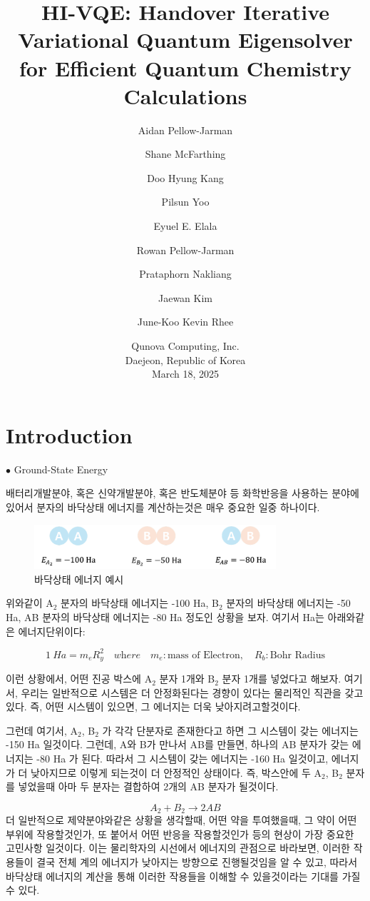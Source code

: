 \documentclass[10pt]{article}
\title{
  HI-VQE: Handover Iterative Variational Quantum Eigensolver\\
  for Efficient Quantum Chemistry Calculations
}
\author{
  Aidan Pellow-Jarman \and
  Shane McFarthing \and
  Doo Hyung Kang \and
  Pilsun Yoo \and
  Eyuel E. Elala \and
  Rowan Pellow-Jarman \and
  Prataphorn Nakliang \and
  Jaewan Kim \and
  June-Koo Kevin Rhee
}
\date{
  Qunova Computing, Inc.\\
  Daejeon, Republic of Korea\\[1ex]
  March 18, 2025
}
\begin{document}
\maketitle

\section{Introduction}
{\Large $\bullet$ Ground-State Energy}

배터리개발분야, 혹은 신약개발분야, 혹은 반도체분야 등 화학반응을 사용하는 분야에 있어서 분자의 바닥상태 에너지를 계산하는것은 매우 중요한 일중 하나이다. 
\begin{figure}[htbp]
  \centering
  \includegraphics[width=0.8\textwidth]{fig/Eg예시.png}
  \caption{바닥상태 에너지 예시}
  \label{fig:example}
\end{figure}

위와같이 A\(_2\) 분자의 바닥상태 에너지는 -100 Ha, B\(_2\) 분자의 바닥상태 에너지는 -50 Ha, AB 분자의 바닥상태 에너지는 -80 Ha 정도인 상황을 보자. 여기서 Ha는 아래와같은 에너지단위이다:

\[
1~Ha = m_e R_y^2 \quad \textit{where} \quad m_e: \text{mass of Electron}, \quad R_b: \text{Bohr Radius}
\]

이런 상황에서, 어떤 진공 박스에 A\(_2\) 분자 1개와 B\(_2\) 분자 1개를 넣었다고 해보자. 
여기서, 우리는 일반적으로 시스템은 더 안정화된다는 경향이 있다는 물리적인 직관을 갖고 있다. 
즉, 어떤 시스템이 있으면, 그 에너지는 더욱 낮아지려고할것이다.

그런데 여기서, A\(_2\), B\(_2\) 가 각각 단분자로 존재한다고 하면 그 시스템이 갖는 에너지는 -150 Ha 일것이다. 
그런데, A와 B가 만나서 AB를 만들면, 하나의 AB 분자가 갖는 에너지는 -80 Ha 가 된다. 
따라서  그 시스템이 갖는 에너지는 -160 Ha 일것이고, 에너지가 더 낮아지므로 이렇게 되는것이 더 안정적인 상태이다.
즉, 박스안에 두 A\(_2\), B\(_2\) 분자를 넣었을때 아마 두 분자는 결합하여 2개의 AB 분자가 될것이다. 

\[
A_2 + B_2 \rightarrow 2AB
\]
더 일반적으로 제약분야와같은 상황을 생각할때, 어떤 약을 투여했을때, 그 약이 어떤 부위에 작용할것인가, 또 붙어서 어떤 반응을 작용할것인가 등의 현상이 가장 중요한 고민사항 일것이다.
이는 물리학자의 시선에서 에너지의 관점으로 바라보면, 이러한 작용들이 결국 전체 계의 에너지가 낮아지는 방향으로 진행될것임을 알 수 있고,
따라서 바닥상태 에너지의 계산을 통해 이러한 작용들을 이해할 수 있을것이라는 기대를 가질 수 있다.
\end{document}
